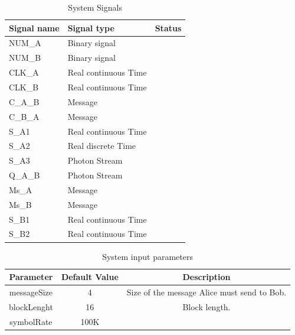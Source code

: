 \begin{table}[hbt]
\centering
\caption{System Signals}
\label{my-label}
\begin{tabular}{|l|l|l|}
\hline
\textbf{Signal name} & \textbf{Signal type} & \textbf{Status} \\ \hline
NUM\_A                &  Binary signal       &                 \\ \hline
NUM\_B                &  Binary signal       &                 \\ \hline
CLK\_A                &  Real continuous Time&                 \\ \hline
CLK\_B                &  Real continuous Time&                 \\ \hline
C\_A\_B                &  Message             &                 \\ \hline
C\_B\_A                &  Message             &                 \\ \hline
S\_A1                 &  Real continuous Time&                 \\ \hline
S\_A2                 &  Real discrete   Time&                 \\ \hline
S\_A3                 &  Photon Stream       &                 \\ \hline
Q\_A\_B                &  Photon Stream       &                 \\ \hline
Ms\_A                 &  Message             &                 \\ \hline
Ms\_B                 &  Message             &                 \\ \hline
S\_B1                 &  Real continuous Time&                 \\ \hline
S\_B2                 &  Real continuous Time&                 \\ \hline

\end{tabular}
\end{table}

\begin{table}[H]
\centering
\caption{System input parameters}
\label{my-label}
\begin{tabular}{|c|c|c|}
\hline
\textbf{Parameter} & \textbf{Default Value} & \textbf{Description}                   \\ \hline
messageSize                              & 4                                           & Size of the message Alice must send to Bob.\\ \hline
blockLenght                              & 16                                          & Block length.                                                  \\ \hline
symbolRate                               & 100K                                        &                                                 \\ \hline
\end{tabular}
\end{table}

